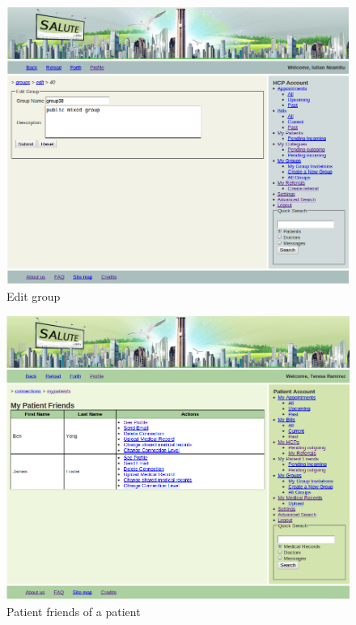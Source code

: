 \begin{figure}
\includegraphics[scale=0.5]{screenshots/edit_group.png}
\caption{Edit group}
\end{figure}

\begin{figure}
\includegraphics[scale=0.5]{screenshots/my_patient_friends.png}
\caption{Patient friends of a patient}
\end{figure}